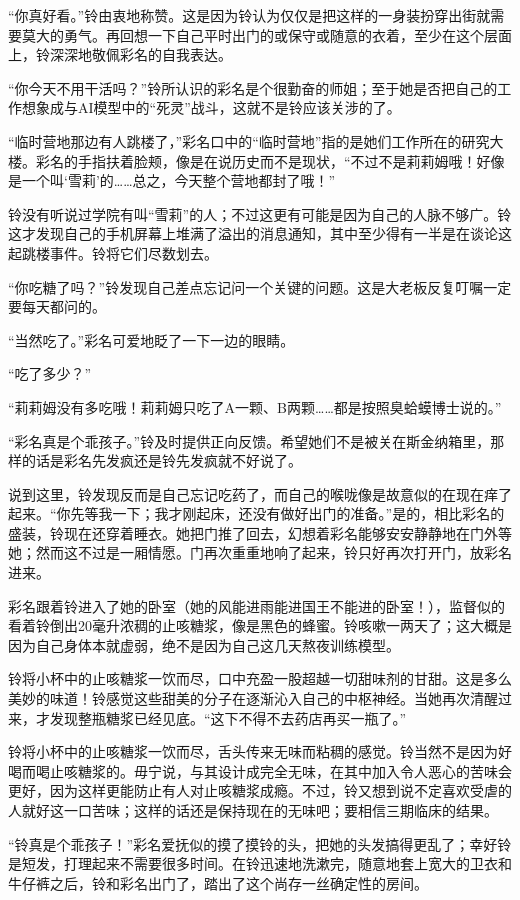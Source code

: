 “你真好看。”铃由衷地称赞。这是因为铃认为仅仅是把这样的一身装扮穿出街就需要莫大的勇气。再回想一下自己平时出门的或保守或随意的衣着，至少在这个层面上，铃深深地敬佩彩名的自我表达。

“你今天不用干活吗？”铃所认识的彩名是个很勤奋的师姐；至于她是否把自己的工作想象成与AI模型中的“死灵”战斗，这就不是铃应该关涉的了。

“临时营地那边有人跳楼了，”彩名口中的“临时营地”指的是她们工作所在的研究大楼。彩名的手指扶着脸颊，像是在说历史而不是现状，“不过不是莉莉姆哦！好像是一个叫‘雪莉’的……总之，今天整个营地都封了哦！”

铃没有听说过学院有叫“雪莉”的人；不过这更有可能是因为自己的人脉不够广。铃这才发现自己的手机屏幕上堆满了溢出的消息通知，其中至少得有一半是在谈论这起跳楼事件。铃将它们尽数划去。

“你吃糖了吗？”铃发现自己差点忘记问一个关键的问题。这是大老板反复叮嘱一定要每天都问的。

“当然吃了。”彩名可爱地眨了一下一边的眼睛。

“吃了多少？”

“莉莉姆没有多吃哦！莉莉姆只吃了A一颗、B两颗……都是按照臭蛤蟆博士说的。”

“彩名真是个乖孩子。”铃及时提供正向反馈。希望她们不是被关在斯金纳箱里，那样的话是彩名先发疯还是铃先发疯就不好说了。

说到这里，铃发现反而是自己忘记吃药了，而自己的喉咙像是故意似的在现在痒了起来。“你先等我一下；我才刚起床，还没有做好出门的准备。”是的，相比彩名的盛装，铃现在还穿着睡衣。她把门推了回去，幻想着彩名能够安安静静地在门外等她；然而这不过是一厢情愿。门再次重重地响了起来，铃只好再次打开门，放彩名进来。

彩名跟着铃进入了她的卧室（她的风能进雨能进国王不能进的卧室！），监督似的看着铃倒出20毫升浓稠的止咳糖浆，像是黑色的蜂蜜。铃咳嗽一两天了；这大概是因为自己身体本就虚弱，绝不是因为自己这几天熬夜训练模型。

\begin{branch}
\badend 铃将小杯中的止咳糖浆一饮而尽，口中充盈一股超越一切甜味剂的甘甜。这是多么美妙的味道！铃感觉这些甜美的分子在逐渐沁入自己的中枢神经。当她再次清醒过来，才发现整瓶糖浆已经见底。“这下不得不去药店再买一瓶了。”
\end{branch}

铃将小杯中的止咳糖浆一饮而尽，舌头传来无味而粘稠的感觉。铃当然不是因为好喝而喝止咳糖浆的。毋宁说，与其设计成完全无味，在其中加入令人恶心的苦味会更好，因为这样更能防止有人对止咳糖浆成瘾。不过，铃又想到说不定喜欢受虐的人就好这一口苦味；这样的话还是保持现在的无味吧；要相信三期临床的结果。

“铃真是个乖孩子！”彩名爱抚似的摸了摸铃的头，把她的头发搞得更乱了；幸好铃是短发，打理起来不需要很多时间。在铃迅速地洗漱完，随意地套上宽大的卫衣和牛仔裤之后，铃和彩名出门了，踏出了这个尚存一丝确定性的房间。

